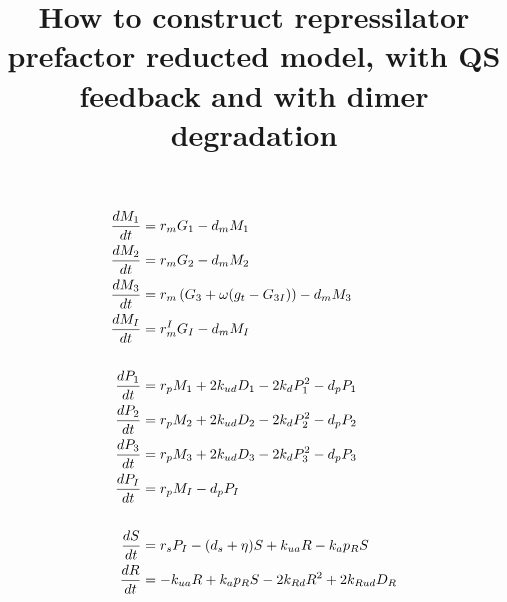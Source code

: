 \documentclass[12pt]{article}
\begin{document}
\title{How to construct repressilator prefactor reducted model, with QS feedback and with dimer degradation}
\maketitle
\begin{align}
	\label{cmM1}
	\frac{dM_{1}}{dt} & =  r_m  G_{1} - d_m  M_{1} \\
	\label{cmM2}
	\frac{dM_{2}}{dt} & =  r_m  G_{2} - d_m  M_{2} \\
	\label{cmM3}
	\frac{dM_{3}}{dt} & =  r_m  \left(G_{3} + \omega  (g_{t} - G_{3I})\right) - d_m  M_{3} \\
	\label{cmMI}
	\frac{dM_{I}}{dt} & =  r_m^{I}  G_{I}  - d_m  M_{I} \\
	\notag\\
	\label{cmP1}
	\frac{dP_{1}}{dt} & =  r_p  M_{1} + 2 k_{ud} D_{1} - 2 k_{d} P_{1}^2 -d_p  P_{1} \\
	\label{cmP2}
	\frac{dP_{2}}{dt} & =  r_p  M_{2} + 2 k_{ud} D_{2} - 2 k_{d} P_{2}^2 -d_p  P_{2} \\
	\label{cmP3}
	\frac{dP_{3}}{dt} & =  r_p  M_{3} + 2 k_{ud} D_{3} - 2 k_{d} P_{3}^2 -d_p  P_{3} \\
	\label{cmPI}
	\frac{dP_{I}}{dt} & =  r_p  M_{I} -d_p  P_{I} \\
	\notag\\
	\label{cmS}
	\frac{dS}{dt} & = r_s P_{I} - (d_s + \eta) S + k_{ua} R - k_{a} p_{R} S \\
	\label{cmR}
	\frac{dR}{dt} & = - k_{ua} R + k_{a} p_{R} S - 2 k_{Rd} R^2 + 2 k_{Rud} D_{R} \\
	\notag
	\end{align}
\end{document}
